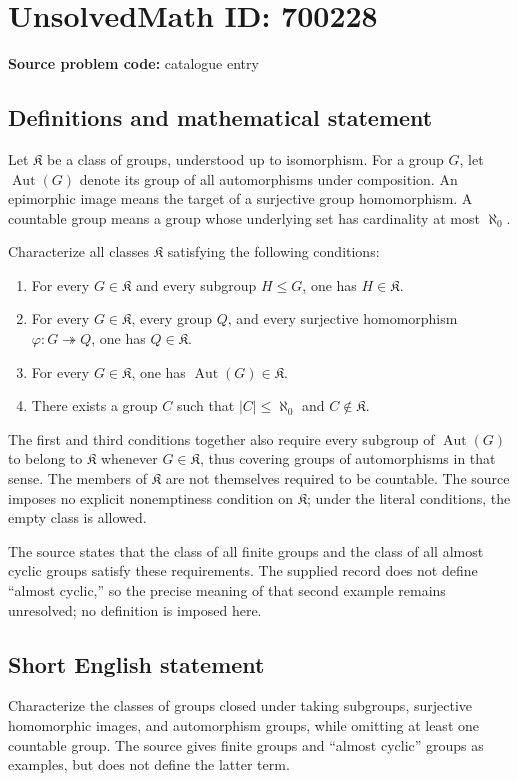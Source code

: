 \documentclass[11pt]{article}
\begin{document}
\section*{UnsolvedMath ID: 700228}
\textbf{Source problem code:} catalogue entry
\subsection{Definitions and mathematical statement}
Let \(\mathfrak K\) be a class of groups, understood up to isomorphism. For a group \(G\), let \(\operatorname{Aut}(G)\) denote its group of all automorphisms under composition. An epimorphic image means the target of a surjective group homomorphism. A countable group means a group whose underlying set has cardinality at most \(\aleph_0\).

Characterize all classes \(\mathfrak K\) satisfying the following conditions:
\begin{enumerate}
\item For every \(G\in\mathfrak K\) and every subgroup \(H\leq G\), one has \(H\in\mathfrak K\).
\item For every \(G\in\mathfrak K\), every group \(Q\), and every surjective homomorphism \(\varphi:G\twoheadrightarrow Q\), one has \(Q\in\mathfrak K\).
\item For every \(G\in\mathfrak K\), one has \(\operatorname{Aut}(G)\in\mathfrak K\).
\item There exists a group \(C\) such that \(|C|\leq\aleph_0\) and \(C\notin\mathfrak K\).
\end{enumerate}
The first and third conditions together also require every subgroup of \(\operatorname{Aut}(G)\) to belong to \(\mathfrak K\) whenever \(G\in\mathfrak K\), thus covering groups of automorphisms in that sense. The members of \(\mathfrak K\) are not themselves required to be countable. The source imposes no explicit nonemptiness condition on \(\mathfrak K\); under the literal conditions, the empty class is allowed.

The source states that the class of all finite groups and the class of all almost cyclic groups satisfy these requirements. The supplied record does not define ``almost cyclic,'' so the precise meaning of that second example remains unresolved; no definition is imposed here.
\subsection{Short English statement}
Characterize the classes of groups closed under taking subgroups, surjective homomorphic images, and automorphism groups, while omitting at least one countable group. The source gives finite groups and ``almost cyclic'' groups as examples, but does not define the latter term.
\end{document}
